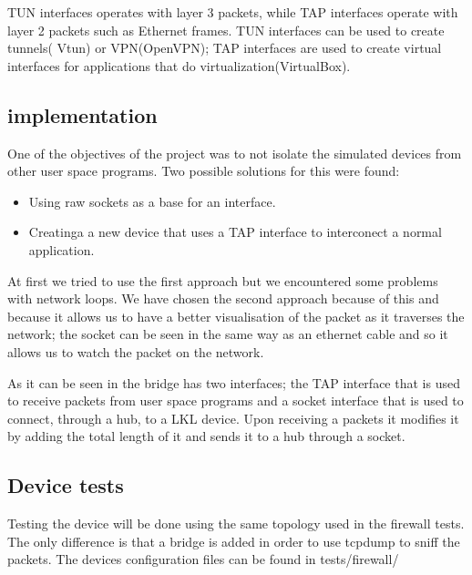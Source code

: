 \lstset{language=C,caption=Opening a tun/tap interface,label=lst:tapopen}


TUN interfaces operates with layer 3 packets, while TAP interfaces operate with layer 
2 packets such as Ethernet frames. TUN interfaces can be used to create tunnels( Vtun)
or VPN(OpenVPN); TAP interfaces are used to create virtual interfaces for applications 
that do virtualization(VirtualBox).

\subsection{\text{\project} implementation}
\label{sub-sec:bridge-lkl}

One of the objectives of the project was to not isolate the simulated devices from other user space 
programs. Two possible solutions for this were found:
\begin{itemize}
  \item Using raw sockets as a base for an interface.
  \item Creatinga a new device that uses a TAP interface to interconect a normal application.
\end{itemize}

At first we tried to use the first approach but we encountered some problems with network loops.
We have chosen the second approach because of this and because it allows us to have a better visualisation of the packet
as it traverses the network; the socket can be seen in the same way as an ethernet cable and so it allows
us to watch the packet on the network.


As it can be seen in  the bridge has two interfaces; the TAP interface that is used to 
receive packets from user space programs and a socket interface that is used to connect, through a hub, to 
a LKL device. Upon receiving a packets it modifies it by adding the total length of it and sends it to a hub 
through a socket.

\subsection{Device tests}
\label{sub-sec:bridge-tests}

Testing the device will be done using the same topology used in the firewall tests. The only difference
is that a bridge is added in order to use tcpdump to sniff the packets. The devices configuration files
can be found in tests/firewall/

